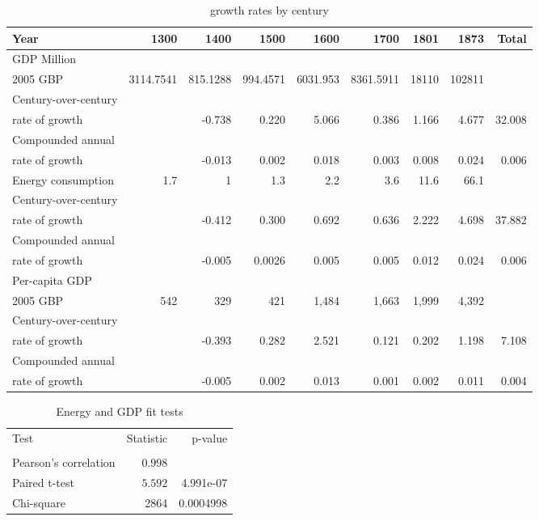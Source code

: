 \documentclass[final]{beamer}
\begin{document}

\begin{frame}
\tiny{
\begin{table}[p!]
\caption{growth rates by century}
\label{tbl:growthByCentury}
\begin{tabular}{lrrrrrrrr}
Year	&	1300	&	1400	&	1500	&	1600	&	1700	&	1801	&	1873&Total	\\
\hline
GDP Million\\ 2005 GBP	&	3114.7541	&	815.1288	&	994.4571	&	6031.953	&	8361.5911	&	18110	&	102811&	\\
Century-over-century\\rate of growth&&-0.738&0.220&5.066&0.386&1.166&4.677&32.008\\
Compounded annual \\rate of growth&&-0.013&0.002&0.018&0.003&0.008&0.024&0.006\\
\hline
Energy consumption&1.7	&	1	&	1.3	&	2.2	&	3.6	&	11.6	&	66.1&	\\
Century-over-century\\rate of growth&&-0.412&0.300&0.692&0.636&2.222&4.698&37.882\\
Compounded annual \\rate of growth&&-0.005&0.0026&0.005&0.005&0.012&0.024&0.006\\
\hline
Per-capita GDP\\2005 GBP&542&  329&  421& 1,484& 1,663& 1,999& 4,392\\
Century-over-century\\rate of growth&&-0.393& 0.282&2.521&0.121&0.202&1.198& 7.108\\
Compounded annual \\rate of growth&&-0.005&0.002&0.013&0.001&0.002& 0.011&0.004\\
\end{tabular}
\end{table}
}
\end{frame}

\begin{frame}
\begin{table}[p!]
\caption{Energy and GDP fit tests}
\label{tbl:fitTest}
\begin{center}
\begin{tabular}{lrr}
\hline\hline
Test&Statistic&p-value\tabularnewline
\multicolumn{1}{c}{}\tabularnewline
\hline
Pearson's correlation&$0.998$&\tabularnewline
\hline
Paired t-test&$5.592$&4.991e-07\tabularnewline
\hline
Chi-square&2864&0.0004998\tabularnewline
\end{tabular}
\end{center}
\end{table}
\end{frame}
\end{document}
